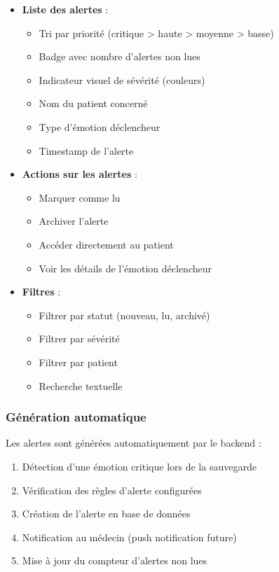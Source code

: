 \documentclass[a4paper,11pt]{report}
\begin{document}
\begin{itemize}
    \item \textbf{Liste des alertes} :
    \begin{itemize}
        \item Tri par priorité (critique > haute > moyenne > basse)
        \item Badge avec nombre d'alertes non lues
        \item Indicateur visuel de sévérité (couleurs)
        \item Nom du patient concerné
        \item Type d'émotion déclencheur
        \item Timestamp de l'alerte
    \end{itemize}
    
    \item \textbf{Actions sur les alertes} :
    \begin{itemize}
        \item Marquer comme lu
        \item Archiver l'alerte
        \item Accéder directement au patient
        \item Voir les détails de l'émotion déclencheur
    \end{itemize}
    
    \item \textbf{Filtres} :
    \begin{itemize}
        \item Filtrer par statut (nouveau, lu, archivé)
        \item Filtrer par sévérité
        \item Filtrer par patient
        \item Recherche textuelle
    \end{itemize}
\end{itemize}

\subsubsection{Génération automatique}

Les alertes sont générées automatiquement par le backend :
\begin{enumerate}
    \item Détection d'une émotion critique lors de la sauvegarde
    \item Vérification des règles d'alerte configurées
    \item Création de l'alerte en base de données
    \item Notification au médecin (push notification future)
    \item Mise à jour du compteur d'alertes non lues
\end{enumerate}
\end{document}
